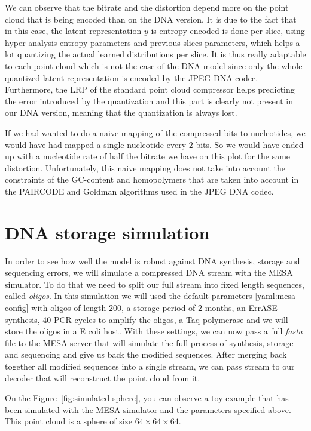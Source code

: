We can observe that the bitrate and the distortion depend more on the point cloud that is being encoded than on the DNA version. It is due to the fact that in this case, the latent representation $y$ is entropy encoded is done per slice, using hyper-analysis entropy parameters and previous slices parameters, which helps a lot quantizing the actual learned distributions per slice. It is thus really adaptable to each point cloud which is not the case of the DNA model since only the whole quantized latent representation is encoded by the JPEG DNA codec. 
Furthermore, the LRP of the standard point cloud compressor helps predicting the error introduced by the quantization and this part is clearly not present in our DNA version, meaning that the quantization is always lost.

If we had wanted to do a naive mapping of the compressed bits to nucleotides, we would have had mapped a single nucleotide every $2$ bits. So we would have ended up with a nucleotide rate of half the bitrate we have on this plot for the same distortion. 
Unfortunately, this naive mapping does not take into account the constraints of the GC-content and homopolymers that are taken into account in the PAIRCODE and Goldman algorithms used in the JPEG DNA codec.

\section{DNA storage simulation}

In order to see how well the model is robust against DNA synthesis, storage and sequencing errors, we will simulate a compressed DNA stream with the MESA simulator. To do that we need to split our full stream into fixed length sequences, called \textit{oligos}. In this simulation we will used the default parameters \ref{yaml:mesa-config} with oligos of length $200$, a storage period of $2$ months, an ErrASE synthesis, $40$ PCR cycles to amplify the oligos, a Taq polymerase and we will store the oligos in a E coli host. With these settings, we can now pass a full \textit{fasta} file to the MESA server that will simulate the full process of synthesis, storage and sequencing and give us back the modified sequences. After merging back together all modified sequences into a single stream, we can pass stream to our decoder that will reconstruct the point cloud from it. 

On the Figure~\ref{fig:simulated-sphere}, you can observe a toy example that has been simulated with the MESA simulator and the parameters specified above. This point cloud is a sphere of size $64 \times 64 \times 64$.

